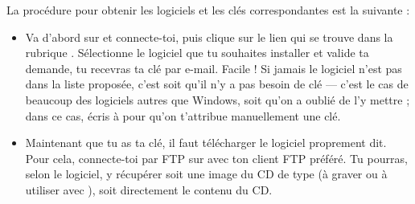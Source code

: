 La proc\'edure pour obtenir les logiciels et les cl\'es correspondantes
est la suivante :
\begin{itemize}

\item Va d'abord sur \fkz et connecte-toi, puis clique sur le lien  qui se trouve dans la rubrique . S\'electionne le logiciel que tu souhaites installer et valide ta demande, tu recevras ta cl\'e par e-mail. Facile ! Si jamais le logiciel n'est pas dans la liste propos\'ee, c'est soit qu'il n'y a pas besoin de cl\'e --- c'est le cas de beaucoup des logiciels autres que Windows, soit qu'on a oubli\'e de l'y mettre ; dans ce cas, \'ecris \`a   pour qu'on t'attribue manuellement une cl\'e.

\item Maintenant que tu as ta cl\'e, il faut t\'el\'echarger le logiciel proprement
dit. Pour cela, connecte-toi par FTP sur  avec ton client FTP pr\'ef\'er\'e. Tu pourras, selon le logiciel, y r\'ecup\'erer soit une image du CD de type  (\`a 
graver ou \`a  utiliser avec ), soit directement le contenu du CD.
 
\end{itemize}

